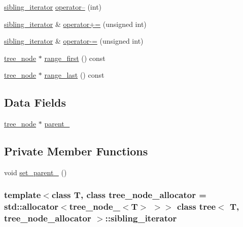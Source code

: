 \begin{CompactItemize}
\item 
\hyperlink{classtree_1_1sibling__iterator}{sibling\_\-iterator} \hyperlink{classtree_1_1sibling__iterator_eac6e7802aabdf7050b314af8d56c81d}{operator--} (int)
\item 
\hyperlink{classtree_1_1sibling__iterator}{sibling\_\-iterator} \& \hyperlink{classtree_1_1sibling__iterator_d36b6994a50c0f73154b08ab35abf336}{operator+=} (unsigned int)
\item 
\hyperlink{classtree_1_1sibling__iterator}{sibling\_\-iterator} \& \hyperlink{classtree_1_1sibling__iterator_f7b0a37317400fe16a1ad422c1ee6fa1}{operator-=} (unsigned int)
\item 
\hyperlink{classtree__node__}{tree\_\-node} $\ast$ \hyperlink{classtree_1_1sibling__iterator_faed5294cdf5a6679c788fff0196c2a8}{range\_\-first} () const 
\item 
\hyperlink{classtree__node__}{tree\_\-node} $\ast$ \hyperlink{classtree_1_1sibling__iterator_85438655c23ba60d2a4f83787e3dcf48}{range\_\-last} () const 
\end{CompactItemize}
\subsection*{Data Fields}
\begin{CompactItemize}
\item 
\hyperlink{classtree__node__}{tree\_\-node} $\ast$ \hyperlink{classtree_1_1sibling__iterator_204f7449ee908f982d21cc3d334d25bc}{parent\_\-}
\end{CompactItemize}
\subsection*{Private Member Functions}
\begin{CompactItemize}
\item 
void \hyperlink{classtree_1_1sibling__iterator_1ccee36d637d78bd30be98a20d582f0e}{set\_\-parent\_\-} ()
\end{CompactItemize}
\subsubsection*{template$<$class T, class tree\_\-node\_\-allocator = std::allocator$<$tree\_\-node\_\-$<$T$>$ $>$$>$ class tree$<$ T, tree\_\-node\_\-allocator $>$::sibling\_\-iterator}



